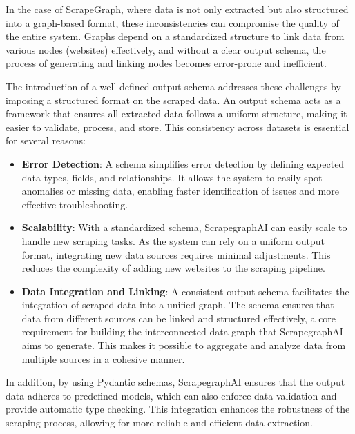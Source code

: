 In the case of ScrapeGraph, where data is not only extracted but also structured into a graph-based format, these inconsistencies can compromise the quality of the entire system. Graphs depend on a standardized structure to link data from various nodes (websites) effectively, and without a clear output schema, the process of generating and linking nodes becomes error-prone and inefficient.

The introduction of a well-defined output schema addresses these challenges by imposing a structured format on the scraped data. An output schema acts as a framework that ensures all extracted data follows a uniform structure, making it easier to validate, process, and store. This consistency across datasets is essential for several reasons:

\begin{itemize}
    \item \textbf{Error Detection}: A schema simplifies error detection by defining expected data types, fields, and relationships. It allows the system to easily spot anomalies or missing data, enabling faster identification of issues and more effective troubleshooting.
    \item \textbf{Scalability}: With a standardized schema, ScrapegraphAI can easily scale to handle new scraping tasks. As the system can rely on a uniform output format, integrating new data sources requires minimal adjustments. This reduces the complexity of adding new websites to the scraping pipeline.
    \item \textbf{Data Integration and Linking}: A consistent output schema facilitates the integration of scraped data into a unified graph. The schema ensures that data from different sources can be linked and structured effectively, a core requirement for building the interconnected data graph that ScrapegraphAI aims to generate. This makes it possible to aggregate and analyze data from multiple sources in a cohesive manner.
\end{itemize}

In addition, by using Pydantic schemas, ScrapegraphAI ensures that the output data adheres to predefined models, which can also enforce data validation and provide automatic type checking. This integration enhances the robustness of the scraping process, allowing for more reliable and efficient data extraction.

